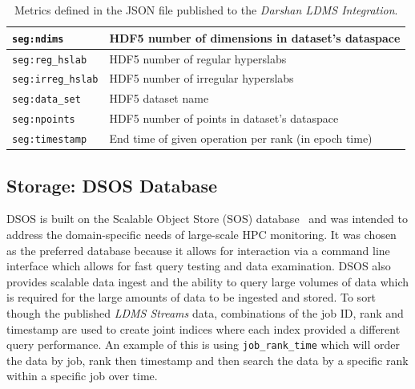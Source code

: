 \begin{table}[h]
{\begin{tabular}{|l|l|}
	\texttt{seg:ndims} & HDF5 number of dimensions in dataset's dataspace\\ \hline
	\texttt{seg:reg\_hslab} & HDF5 number of regular hyperslabs\\ \hline
        \texttt{seg:irreg\_hslab} & HDF5 number of irregular hyperslabs\\ \hline
	\texttt{seg:data\_set} & HDF5 dataset name\\ \hline
	\texttt{seg:npoints} & HDF5 number of points in dataset's dataspace\\ \hline
        \texttt{seg:timestamp} & End time of given operation per rank (in epoch time)\\ \hline          
	\end{tabular}}
	\caption{Metrics defined in the JSON file published to the \emph{Darshan LDMS Integration}.}
	\label{table:metrics}
      \end{table}

\subsection{Storage: DSOS Database}
DSOS is built on the Scalable Object Store (SOS) database~\cite{sosgithub} and was intended to address the domain-specific needs of large-scale HPC monitoring. It was chosen as the preferred database because it allows for interaction via a command line interface which allows for fast query testing and data examination. DSOS also provides scalable data ingest and the ability to query large volumes of data which is required for the large amounts of data to be ingested and stored. %
To sort though the published \emph{LDMS Streams} data, combinations of the job ID, rank and timestamp are used to create joint indices where each index provided a different query performance. An example of this is using \texttt{job\_rank\_time} which will order the data by job, rank then timestamp and then search the data by a specific rank within a specific job over time.

